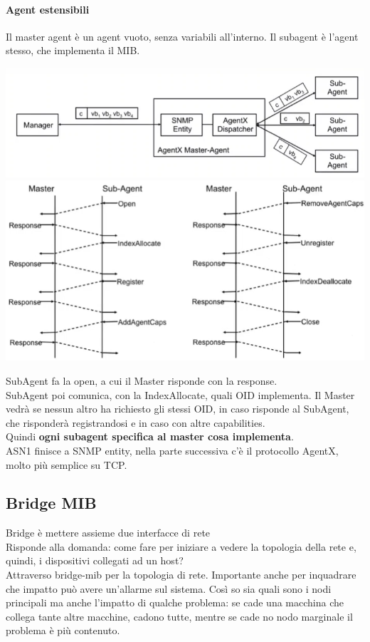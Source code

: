 \documentclass[10pt]{book}
\begin{document}
\paragraph{Agent estensibili} Il master agent è un agent vuoto, senza variabili all'interno. Il subagent è l'agent stesso, che implementa il MIB.
\begin{center}
	\includegraphics[scale=0.75]{snmp3agentestensibili.png}\\
	\includegraphics[scale=0.6]{snmp3agentestensibili2.png}
\end{center}
SubAgent fa la open, a cui il Master risponde con la response.\\SubAgent poi comunica, con la IndexAllocate, quali OID implementa. Il Master vedrà se nessun altro ha richiesto gli stessi OID, in caso risponde al SubAgent, che risponderà registrandosi e in caso con altre capabilities.\\
Quindi \textbf{ogni subagent specifica al master cosa implementa}.\\
ASN1 finisce a SNMP entity, nella parte successiva c'è il protocollo AgentX, molto più semplice su TCP.
\subsection{Bridge MIB}
Bridge è mettere assieme due interfacce di rete\\
Risponde alla domanda: come fare per iniziare a vedere la topologia della rete e, quindi, i dispositivi collegati ad un host?\\
Attraverso bridge-mib per la topologia di rete. Importante anche per inquadrare che impatto può avere un'allarme sul sistema. Così so sia quali sono i nodi principali ma anche l'impatto di qualche problema: se cade una macchina che collega tante altre macchine, cadono tutte, mentre se cade no nodo marginale il problema è più contenuto.
\end{document}
